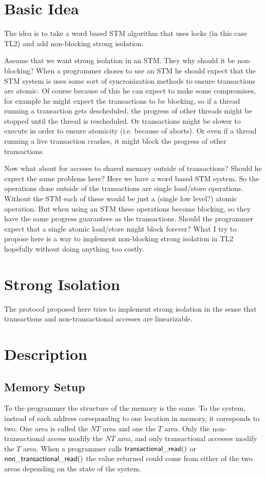 \documentclass[11pt]{article}
\begin{document}
\section{Basic Idea}
The idea is to take a word based STM algorithm that uses locks (in this case TL2) and add non-blocking strong isolation.

Assume that we want strong isolation in an STM.  They why should it be non-blocking?
When a programmer choses to use an STM he should expect that the STM system is uses some sort of syncronization methods to ensure
transactions are atomic.
Of course because of this he can expect to make some compromises, for example he might expect the transactions to be blocking, so
if a thread running a transaction gets descheduled, the progress of other threads might be stopped until the thread is rescheduled.
Or transactions might be slower to execute in order to ensure atomicity (i.e. because of aborts).
Or even if a thread running a live transaction crashes, it might block the progress of other transactions.

Now what about for acceses to shared memory outside of transactions?
Should he expect the same problems here?
Here we have a word based STM system.
So the operations done outside of the transactions are single load/store operations.
Without the STM each of these would be just a (single low level?) atomic operation.
But when using an STM these operations become blocking, so they have the same progress guarantees as the transactions.
Should the programmer expect that a single atomic load/store might block forever?
What I try to propose here is a way to implement non-blocking strong isolation in TL2 hopefully without doing anything too costly.

\section{Strong Isolation}
The protocol proposed here tries to implement strong isolation in the sense that transactions and non-transactional accesses are
linearizable.

\section{Description}

\subsection{Memory Setup}
To the programmer the structure of the memory is the same.
To the system, instead of each address coresponding to one location in memory, it coresponds to two.
One area is called the $NT$ area and one the $T$ area.
Only the non-transactional access modify the $NT$ area, and only transactional accesses modify the $T$ area.
When a programmer calls ${\sf transactional\_read}()$ or ${\sf non\_transactional\_read}()$ the value returned could come from either
of the two areas depending on the state of the system.
\end{document}
